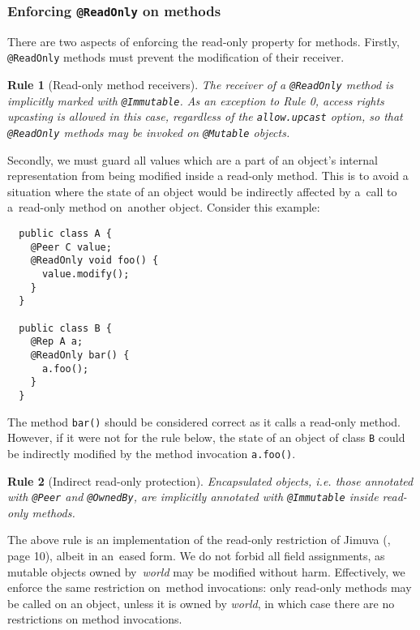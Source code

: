\documentclass{pracamgr}
\theoremstyle{break}
\theoremstyle{break}
\theoremstyle{break}
\newtheorem{verrule}{Rule}
\begin{document}
\subsubsection{Enforcing \texttt{@ReadOnly} on methods} 
\label{sec:rules:readonly}

There are two aspects of enforcing the read-only property for methods.
Firstly, \texttt{@ReadOnly} methods must prevent the modification of
their receiver.

\begin{verrule}[Read-only method receivers] \label{vrl:readonly:rec}
  The receiver of a \texttt{@ReadOnly} method is implicitly marked
  with \texttt{@Immutable}. As an exception to Rule 0, access rights
  upcasting is allowed in this case, regardless of the
  \texttt{allow.upcast} option, so that \texttt{@ReadOnly} methods may
  be invoked on \texttt{@Mutable} objects.
\end{verrule}

Secondly, we must guard all values which are a part of an object's
internal representation from being modified inside a read-only
method. This is to avoid a situation where the state of an object
would be indirectly affected by a~call to a~read-only method
on~another object. Consider this example:

\begin{lstlisting}
  public class A {
    @Peer C value;
    @ReadOnly void foo() {
      value.modify(); 
    }
  }

  public class B {
    @Rep A a;
    @ReadOnly bar() {
      a.foo();
    }
  }
\end{lstlisting}

The method \texttt{bar()} should be considered correct as it calls a
read-only method. However, if it were not for the rule below, the
state of an object of class \texttt{B} could be indirectly modified 
by the method invocation \texttt{a.foo()}. 

\begin{verrule}[Indirect read-only
  protection] \label{vrl:readonly:meth} Encapsulated objects,
  i.e. those annotated with \texttt{@Peer} and \texttt{@OwnedBy}, are
  implicitly annotated with \texttt{@Immutable} inside read-only
  methods.
\end{verrule}

The above rule is an implementation of the read-only restriction of
Jimuva (\cite{haack}, page 10), albeit in an~eased form. We do not
forbid all field assignments, as mutable objects owned by~\emph{world}
may be modified without harm. Effectively, we enforce the same
restriction on~method invocations: only read-only methods may be
called on an object, unless it is owned by \emph{world}, in which case
there are no restrictions on method invocations.
\end{document}
